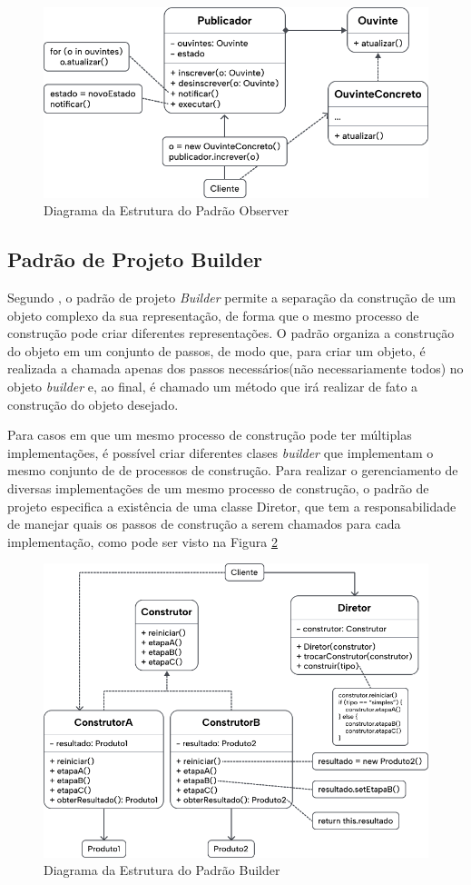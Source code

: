 \documentclass[12pt, %
openright, 
oneside, %
a4paper,    %
brazil]{facom-ufu-abntex2}
\begin{document}
\begin{figure}[ht]
    \centering
    \includegraphics[width=.65\textwidth]{figures/design_patterns/observer_diagram.png}
    \caption{Diagrama da Estrutura do Padrão Observer}
    \label{fig:observer_diagram}
\end{figure}

\subsection{Padrão de Projeto Builder}

Segundo , o padrão de projeto \textit{Builder} permite a separação da construção de um objeto complexo da sua representação, de forma que o mesmo processo de construção pode criar diferentes representações. O padrão organiza a construção do objeto em um conjunto de passos, de modo que, para criar um objeto, é realizada a chamada apenas dos passos necessários(não necessariamente todos) no objeto \textit{builder} e, ao final, é chamado um método que irá realizar de fato a construção do objeto desejado.

Para casos em que um mesmo processo de construção pode ter múltiplas implementações, é possível criar diferentes clases \textit{builder} que implementam o mesmo conjunto de de processos de construção. Para realizar o gerenciamento de diversas implementações de um mesmo processo de construção, o padrão de projeto especifica a existência de uma classe Diretor, que tem a responsabilidade de manejar quais os passos de construção a serem chamados para cada implementação, como pode ser visto na Figura \ref{fig:builder_diagram}

\begin{figure}[ht]
    \centering
    \includegraphics[width=.65\textwidth]{figures/design_patterns/builder_diagram.png}
    \caption{Diagrama da Estrutura do Padrão Builder}
    \label{fig:builder_diagram}
\end{figure}
\end{document}
